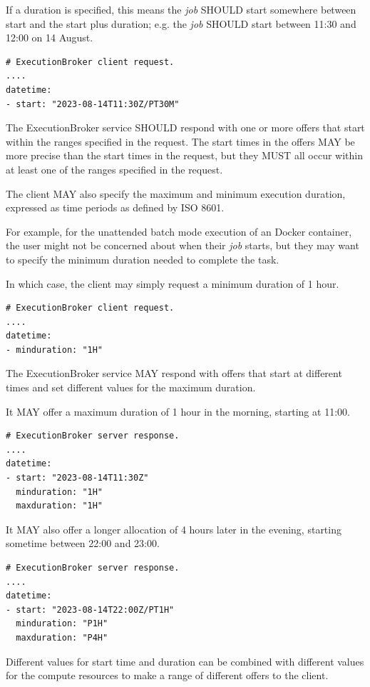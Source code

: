 \documentclass[11pt,a4paper]{ivoa}
\newcommand{\execbrokerclass} {ExecutionBroker}
\newcommand{\dockercontainer} {Docker container}
\newcommand{\job} {\textit{job}}
\begin{document}
If a duration is specified, this means the \job{} SHOULD start somewhere between
start and the start plus duration;
e.g. the \job{} SHOULD start between 11:30 and 12:00 on 14 August.
\begin{lstlisting}[]
# ExecutionBroker client request.
....
datetime:
- start: "2023-08-14T11:30Z/PT30M"
\end{lstlisting}

The \execbrokerclass{} service SHOULD respond with one or more offers that start within
the ranges specified in the request.
The start times in the offers MAY be more precise than the start times in the request,
but they MUST all occur within at least one of the ranges specified in the request.

The client MAY also specify the maximum and minimum execution duration,
expressed as time periods as defined by ISO 8601.

For example, for the unattended batch mode execution of an \dockercontainer, the user might not be concerned about
when their \job{} starts, but they may want to specify the minimum duration needed to complete the task.

In which case, the client may simply request a minimum duration of 1 hour.
\begin{lstlisting}[]
# ExecutionBroker client request.
....
datetime:
- minduration: "1H"
\end{lstlisting}

The \execbrokerclass{} service MAY respond with offers that start at different times and
set different values for the maximum duration.

It MAY offer a maximum duration of 1 hour in the morning, starting at 11:00.
\begin{lstlisting}[]
# ExecutionBroker server response.
....
datetime:
- start: "2023-08-14T11:30Z"
  minduration: "1H"
  maxduration: "1H"
\end{lstlisting}

It MAY also offer a longer allocation of 4 hours later in the evening,
starting sometime between 22:00 and 23:00.
\begin{lstlisting}[]
# ExecutionBroker server response.
....
datetime:
- start: "2023-08-14T22:00Z/PT1H"
  minduration: "P1H"
  maxduration: "P4H"
\end{lstlisting}

Different values for start time and duration can be combined with different values for the
compute resources to make a range of different offers to the client.
\end{document}

